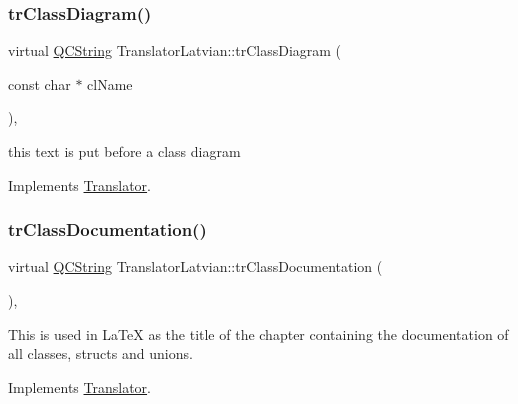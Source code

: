 \mbox{\label{class_translator_latvian_a4548a6329665486457aeb33a3cf7780a}} 
\subsubsection{\texorpdfstring{trClassDiagram()}{trClassDiagram()}}
{\footnotesize\ttfamily virtual \mbox{\hyperlink{class_q_c_string}{Q\+C\+String}} Translator\+Latvian\+::tr\+Class\+Diagram (\begin{DoxyParamCaption}\item[{const char $\ast$}]{cl\+Name }\end{DoxyParamCaption})\hspace{0.3cm}{\ttfamily [inline]}, {\ttfamily [virtual]}}

this text is put before a class diagram 

Implements \mbox{\hyperlink{class_translator}{Translator}}.

\mbox{\label{class_translator_latvian_afb9e6466b8d02b276b8517f4d825e7ee}} 
\subsubsection{\texorpdfstring{trClassDocumentation()}{trClassDocumentation()}}
{\footnotesize\ttfamily virtual \mbox{\hyperlink{class_q_c_string}{Q\+C\+String}} Translator\+Latvian\+::tr\+Class\+Documentation (\begin{DoxyParamCaption}{ }\end{DoxyParamCaption})\hspace{0.3cm}{\ttfamily [inline]}, {\ttfamily [virtual]}}

This is used in La\+TeX as the title of the chapter containing the documentation of all classes, structs and unions. 

Implements \mbox{\hyperlink{class_translator}{Translator}}.

\mbox{\label{class_translator_latvian_aa6afa8cad79e473a2b9f3367e9dca169}} 
